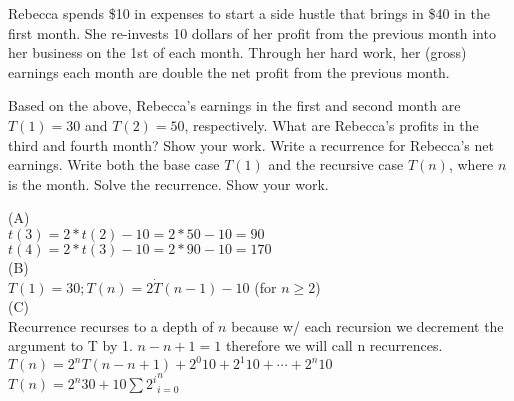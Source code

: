 \documentclass[solution,letterpaper]{cs20}
\begin{document}
    \begin{problem}

        Rebecca spends \$10 in expenses to start a side hustle that brings in \$40 in the first month. She re-invests 10 dollars of her profit from the previous month into her business on the 1st of each month. Through her hard work, her (gross) earnings each month are double the net profit from the previous month.

        \subproblem Based on the above, Rebecca's earnings in the first and second month are $T(1) = 30$ and $T(2) = 50$, respectively. What are Rebecca's profits in the third and fourth month? Show your work.
        \subproblem Write a recurrence for Rebecca's net earnings. Write both the base case $T(1)$ and the recursive case $T(n)$, where $n$ is the month.
        \subproblem Solve the recurrence. Show your work.


        \begin{solution}
        (A) \\
        $t(3) = 2 * t(2) - 10 = 2 * 50 - 10 = 90$ \\
        $t(4) = 2 * t(3) - 10 = 2 * 90 - 10 = 170$ \\

        (B) \\
        $T(1) = 30; T(n) = 2 \dot T(n-1) - 10$ (for $n \geq 2$) \\

        (C) \\
        Recurrence recurses to a depth of $n$ because w/ each recursion we decrement the argument to T by 1. $n - n + 1 = 1$ therefore we will call n recurrences. \\
        $T(n) = 2^{n}T(n-n+1) + 2^0{10} + 2^1{10} + \cdots + 2^{n}10$\\
        $T(n) = 2^{n}30 + 10\sum{2^i}_{i=0}^{n}$


        \end{solution}
    \end{problem}
\end{document}
